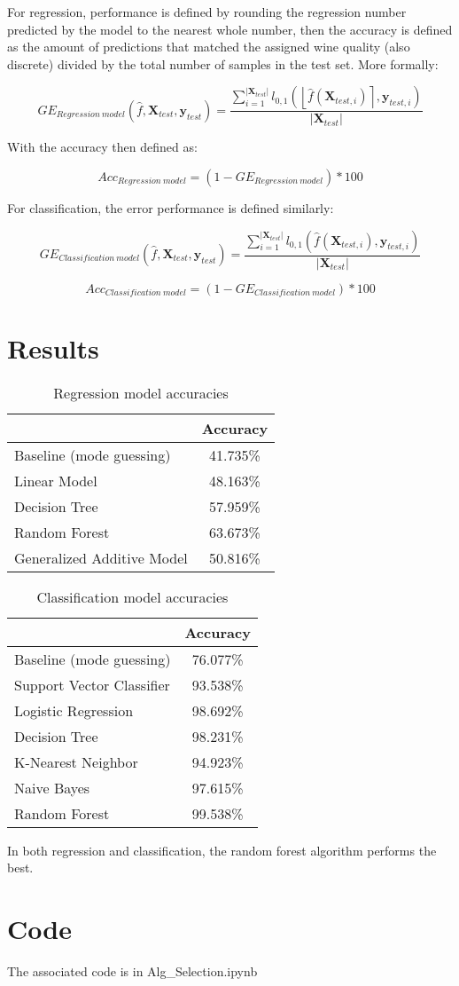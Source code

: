 \documentclass[12pt, letterpaper]{article}
\begin{document}
For regression, performance is defined by rounding the regression number predicted by the model to the nearest whole number, then the accuracy is defined as the amount of predictions that matched the assigned wine quality (also discrete) divided by the total number of samples in the test set. More formally:

$$
    GE_{Regression\ model}(\hat{f}, \bm{X}_{test}, \bm{y}_{test}) = \frac{\sum_{i=1}^{|\bm{X}_{test}|}l_{0,1}(\left\lfloor \hat{f}(\bm{X}_{test,i}) \right\rceil, \bm{y}_{test,i})}{|\bm{X}_{test}|}
$$

With the accuracy then defined as:

$$
Acc_{Regression\ model} = (1 - GE_{Regression\ model}) * 100
$$

For classification, the error performance is defined similarly:

$$
    GE_{Classification\ model}(\hat{f}, \bm{X}_{test}, \bm{y}_{test}) = \frac{\sum_{i=1}^{|\bm{X}_{test}|}l_{0,1}(\hat{f}(\bm{X}_{test,i}), \bm{y}_{test,i})}{|\bm{X}_{test}|}
$$

$$
Acc_{Classification\ model} = (1 - GE_{Classification\ model}) * 100
$$

\section{Results} %

\begin{table}[h]
\centering
\caption{Regression model accuracies}
\label{reg_table}
\begin{tabular}{l|c} %
  & Accuracy \\ \hline
Baseline (mode guessing) & 41.735\% \\
Linear Model & 48.163\% \\
Decision Tree & 57.959\% \\
Random Forest & 63.673\% \\
Generalized Additive Model & 50.816\% \\
\end{tabular}
\end{table}

\begin{table}[h]
\centering
\caption{Classification model accuracies}
\label{cls_table}
\begin{tabular}{l|c} %
  & Accuracy \\ \hline
Baseline (mode guessing) & 76.077\% \\
Support Vector Classifier & 93.538\% \\
Logistic Regression & 98.692\% \\
Decision Tree & 98.231\% \\
K-Nearest Neighbor & 94.923\% \\
Naive Bayes & 97.615\% \\
Random Forest & 99.538\% \\
\end{tabular}
\end{table}

In both regression and classification, the random forest algorithm performs the best.

\section{Code} %

The associated code is in Alg\_Selection.ipynb
\end{document}
